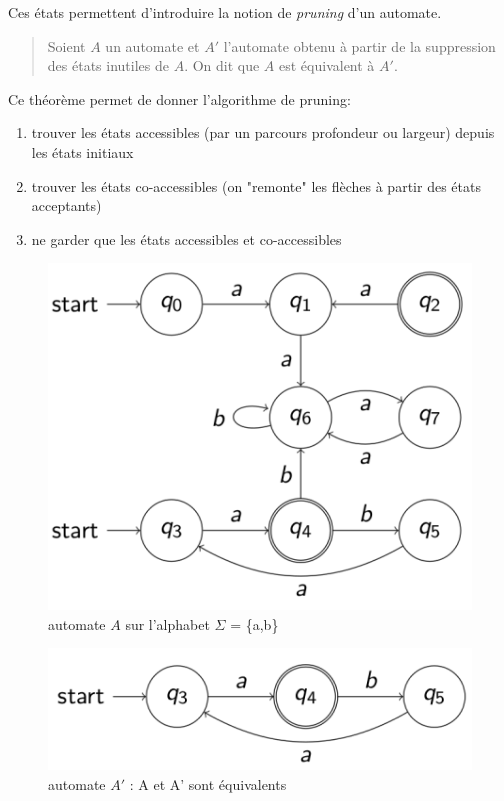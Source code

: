 \documentclass{article}
\begin{document}
Ces états permettent d'introduire la notion de \textit{pruning} d'un automate.
\begin{quote}
    Soient $A$ un automate et $A'$ l'automate obtenu à partir de la suppression des états inutiles de $A$. On dit que $A$ est équivalent à $A'$.
\end{quote}

Ce théorème permet de donner l'algorithme de pruning:
\begin{enumerate}
    \item trouver les états accessibles (par un parcours profondeur ou largeur) depuis les états initiaux
    \item trouver les états co-accessibles (on "remonte" les flèches à partir des états acceptants)
    \item ne garder que les états accessibles et co-accessibles
\end{enumerate}
\begin{figure}
    \centering
    \includegraphics[scale=0.25]{Image12.png}
    \caption{automate $A$ sur l'alphabet $\Sigma$ = \{a,b\}}
\end{figure}
\begin{figure}
    \centering
    \includegraphics[scale=0.25]{Image13.png}
    \caption{automate $A'$ : A et A' sont équivalents}
\end{figure}
\newpage
\end{document}
